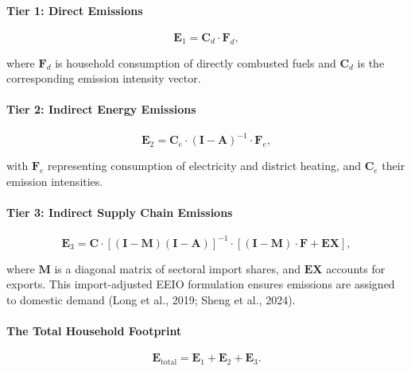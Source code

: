 \documentclass[12pt,a4paper]{article}%
\begin{document}
\paragraph{Tier 1: Direct Emissions}

\begin{equation}
\mathbf{E}_1 = \mathbf{C}_d \cdot \mathbf{F}_d,
\end{equation}

where \( \mathbf{F}_d \) is household consumption of directly combusted fuels and \( \mathbf{C}_d \) is the corresponding emission intensity vector.

\paragraph{Tier 2: Indirect Energy Emissions}

\begin{equation}
\mathbf{E}_2 = \mathbf{C}_e \cdot {(\mathbf{I} - \mathbf{A})}^{-1} \cdot \mathbf{F}_e,
\end{equation}

with \( \mathbf{F}_e \) representing consumption of electricity and district heating, and \( \mathbf{C}_e \) their emission intensities.

\paragraph{Tier 3: Indirect Supply Chain Emissions}

\begin{equation}
\mathbf{E}_3 = \mathbf{C} \cdot {\left[(\mathbf{I} - \mathbf{M})(\mathbf{I} - \mathbf{A})\right]}^{-1} \cdot \left[(\mathbf{I} - \mathbf{M}) \cdot \mathbf{F} + \mathbf{EX} \right],
\end{equation}

where \( \mathbf{M} \) is a diagonal matrix of sectoral import shares, and \( \mathbf{EX} \) accounts for exports. This import-adjusted EEIO formulation ensures emissions are assigned to domestic demand (Long et al., 2019; Sheng et al., 2024).
 
\paragraph{The Total Household Footprint}

\begin{equation}
    \mathbf{E}_{\text{total}} = \mathbf{E}_1 + \mathbf{E}_2 + \mathbf{E}_3.
\end{equation}
\end{document}
